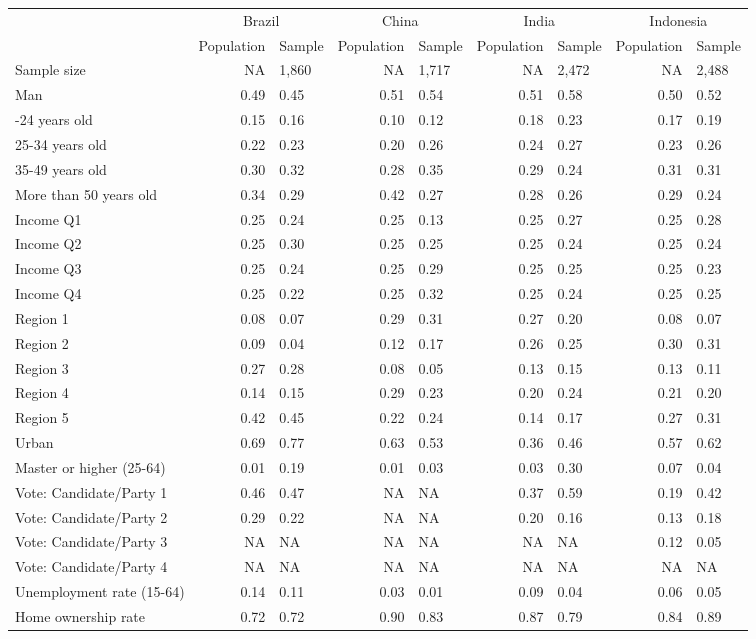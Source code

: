 
\begin{tabular}[t]{lrlrlrlrl}
\toprule
\multicolumn{1}{c}{} & \multicolumn{2}{c}{Brazil} & \multicolumn{2}{c}{China} & \multicolumn{2}{c}{India} & \multicolumn{2}{c}{Indonesia} \\
\cmidrule(l{3pt}r{3pt}){2-3} \cmidrule(l{3pt}r{3pt}){4-5} \cmidrule(l{3pt}r{3pt}){6-7} \cmidrule(l{3pt}r{3pt}){8-9}
  & Population & Sample & Population & Sample & Population & Sample & Population & Sample\\
\midrule
Sample size & NA & 1,860 & NA & 1,717 & NA & 2,472 & NA & 2,488\\
\midrule
Man & 0.49 & 0.45 & 0.51 & 0.54 & 0.51 & 0.58 & 0.50 & 0.52\\
\addlinespace
18-24 years old & 0.15 & 0.16 & 0.10 & 0.12 & 0.18 & 0.23 & 0.17 & 0.19\\
25-34 years old & 0.22 & 0.23 & 0.20 & 0.26 & 0.24 & 0.27 & 0.23 & 0.26\\
35-49 years old & 0.30 & 0.32 & 0.28 & 0.35 & 0.29 & 0.24 & 0.31 & 0.31\\
More than 50 years old & 0.34 & 0.29 & 0.42 & 0.27 & 0.28 & 0.26 & 0.29 & 0.24\\
\addlinespace
Income Q1 & 0.25 & 0.24 & 0.25 & 0.13 & 0.25 & 0.27 & 0.25 & 0.28\\
Income Q2 & 0.25 & 0.30 & 0.25 & 0.25 & 0.25 & 0.24 & 0.25 & 0.24\\
Income Q3 & 0.25 & 0.24 & 0.25 & 0.29 & 0.25 & 0.25 & 0.25 & 0.23\\
Income Q4 & 0.25 & 0.22 & 0.25 & 0.32 & 0.25 & 0.24 & 0.25 & 0.25\\
\addlinespace
Region 1 & 0.08 & 0.07 & 0.29 & 0.31 & 0.27 & 0.20 & 0.08 & 0.07\\
Region 2 & 0.09 & 0.04 & 0.12 & 0.17 & 0.26 & 0.25 & 0.30 & 0.31\\
Region 3 & 0.27 & 0.28 & 0.08 & 0.05 & 0.13 & 0.15 & 0.13 & 0.11\\
Region 4 & 0.14 & 0.15 & 0.29 & 0.23 & 0.20 & 0.24 & 0.21 & 0.20\\
Region 5 & 0.42 & 0.45 & 0.22 & 0.24 & 0.14 & 0.17 & 0.27 & 0.31\\
\addlinespace
Urban & 0.69 & 0.77 & 0.63 & 0.53 & 0.36 & 0.46 & 0.57 & 0.62\\
\addlinespace
Master or higher (25-64) & 0.01 & 0.19 & 0.01 & 0.03 & 0.03 & 0.30 & 0.07 & 0.04\\
\addlinespace
Vote: Candidate/Party 1 & 0.46 & 0.47 & NA & NA & 0.37 & 0.59 & 0.19 & 0.42\\
Vote: Candidate/Party 2 & 0.29 & 0.22 & NA & NA & 0.20 & 0.16 & 0.13 & 0.18\\
Vote: Candidate/Party 3 & NA & NA & NA & NA & NA & NA & 0.12 & 0.05\\
Vote: Candidate/Party 4 & NA & NA & NA & NA & NA & NA & NA & NA\\
\addlinespace
Unemployment rate (15-64) & 0.14 & 0.11 & 0.03 & 0.01 & 0.09 & 0.04 & 0.06 & 0.05\\
\addlinespace
Home ownership rate & 0.72 & 0.72 & 0.90 & 0.83 & 0.87 & 0.79 & 0.84 & 0.89\\
\bottomrule
\end{tabular}